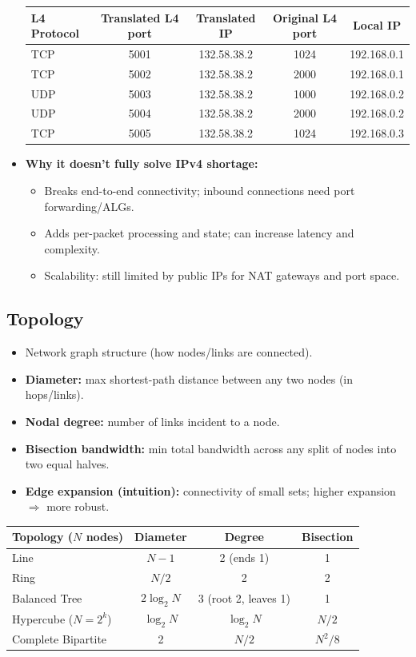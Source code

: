 \begin{itemize}
{{\begin{tabular}{l|c|c|c|c}
			\textbf{L4 Protocol} & \textbf{Translated L4 port} & \textbf{Translated IP} & \textbf{Original L4 port} & \textbf{Local IP} \\
			\hline
			TCP & 5001 & 132.58.38.2 & 1024 & 192.168.0.1 \\
			TCP & 5002 & 132.58.38.2 & 2000 & 192.168.0.1 \\
			UDP & 5003 & 132.58.38.2 & 1000 & 192.168.0.2 \\
			UDP & 5004 & 132.58.38.2 & 2000 & 192.168.0.2 \\
			TCP & 5005 & 132.58.38.2 & 1024 & 192.168.0.3 \\
			\end{tabular}
		}
	}
	\item \textbf{Why it doesn't fully solve IPv4 shortage:}
	\begin{itemize}
		\item Breaks end-to-end connectivity; inbound connections need port forwarding/ALGs.
		\item Adds per-packet processing and state; can increase latency and complexity.
		\item Scalability: still limited by public IPs for NAT gateways and port space.
	\end{itemize}
\end{itemize}



\subsection{Topology}
\begin{itemize}
	\item Network graph structure (how nodes/links are connected).
	\item \textbf{Diameter:} max shortest-path distance between any two nodes (in hops/links).
	\item \textbf{Nodal degree:} number of links incident to a node.
	\item \textbf{Bisection bandwidth:} min total bandwidth across any split of nodes into two equal halves.
	\item \textbf{Edge expansion (intuition):} connectivity of small sets; higher expansion \(\Rightarrow\) more robust.
\end{itemize}

\begin{center}
\renewcommand{\arraystretch}{1.2}
\setlength{\tabcolsep}{4pt}
\begin{tabular}{l|c|c|c}
\textbf{Topology ($N$ nodes)} & \textbf{Diameter} & \textbf{Degree} & \textbf{Bisection} \\
\hline
Line & $N-1$ & 2 (ends 1) & 1 \\
Ring & $N/2$ & 2 & 2 \\
Balanced Tree & $2 \log_2 N$ & 3 (root 2, leaves 1) & 1 \\
Hypercube ($N=2^k$) & $\log_2 N$ & $\log_2 N$ & $N/2$ \\
Complete Bipartite & 2 & $N/2$ & $N^2/8$ \\
\end{tabular}
\end{center}



